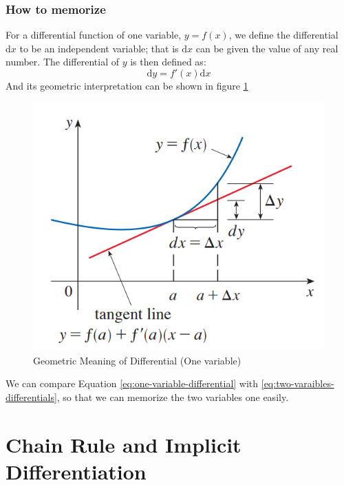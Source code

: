 \documentclass[math,code]{amznotes}
\theoremstyle{remark}
\begin{document}
\subsubsection{How to memorize}
For a differential function of one variable, $y=f(x)$, we define the differential $\mathrm d x$ to be an independent variable; that is $\mathrm d x$ can be given the value of any real number. The differential of $y$ is then defined as:
\begin{equation} \label{eq:one-variable-differential}
    \mathrm d y = f'(x)\mathrm d x
\end{equation}
And its geometric interpretation can be shown in figure \ref{fig:geometric-meaning-of-differential-one-variable}
\begin{figure}[H]
    \centering
    \includegraphics[width=0.4\linewidth]{images/geometric-meaning-of-differential-one-variable.png}
    \caption{Geometric Meaning of Differential (One variable)}
    \label{fig:geometric-meaning-of-differential-one-variable}
\end{figure}
We can compare Equation \eqref{eq:one-variable-differential} with \eqref{eq:two-varaibles-differentials}, so that we can memorize the two variables one easily.
\section{Chain Rule and Implicit Differentiation}
\end{document}
